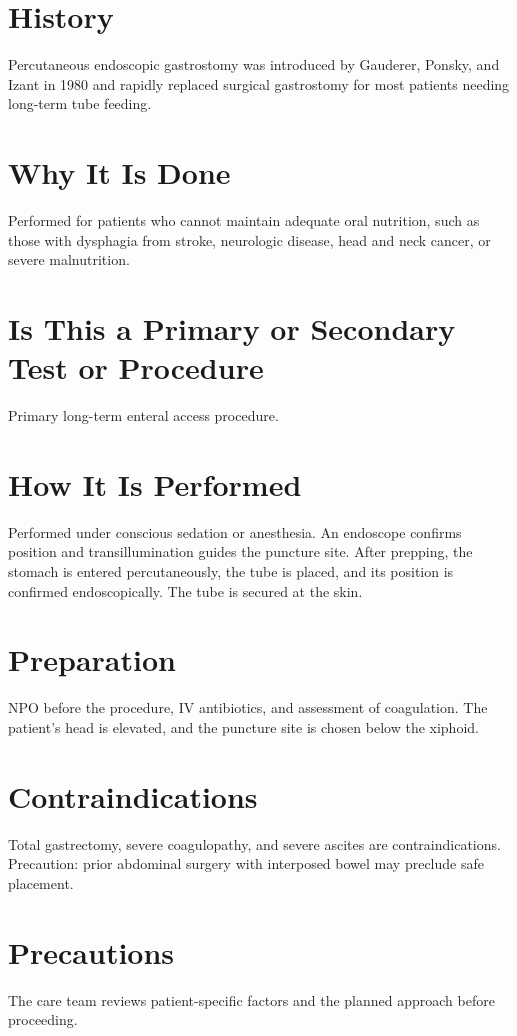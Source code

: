 \section*{History}
Percutaneous endoscopic gastrostomy was introduced by Gauderer, Ponsky, and Izant in 1980 and rapidly replaced surgical gastrostomy for most patients needing long-term tube feeding.

\section*{Why It Is Done}
Performed for patients who cannot maintain adequate oral nutrition, such as those with dysphagia from stroke, neurologic disease, head and neck cancer, or severe malnutrition.

\section*{Is This a Primary or Secondary Test or Procedure}
Primary long-term enteral access procedure.

\section*{How It Is Performed}
Performed under conscious sedation or anesthesia. An endoscope confirms position and transillumination guides the puncture site. After prepping, the stomach is entered percutaneously, the tube is placed, and its position is confirmed endoscopically. The tube is secured at the skin.

\section*{Preparation}
NPO before the procedure, IV antibiotics, and assessment of coagulation. The patient's head is elevated, and the puncture site is chosen below the xiphoid.

\section*{Contraindications}
Total gastrectomy, severe coagulopathy, and severe ascites are contraindications. Precaution: prior abdominal surgery with interposed bowel may preclude safe placement.

\section*{Precautions}
The care team reviews patient-specific factors and the planned approach before proceeding.

